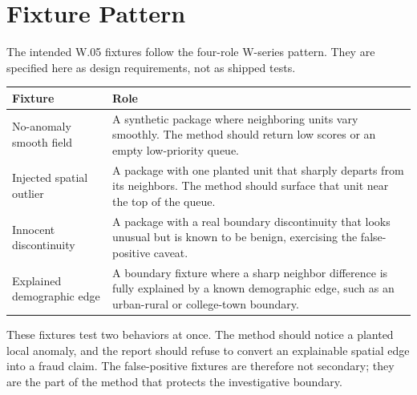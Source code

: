 \section{Fixture Pattern}

The intended W.05 fixtures follow the four-role W-series pattern. They are
specified here as design requirements, not as shipped tests.

\begin{center}
\small
\begin{tabularx}{\textwidth}{lX}
\toprule
Fixture & Role \\
\midrule
No-anomaly smooth field & A synthetic package where neighboring units vary smoothly. The method should return low scores or an empty low-priority queue. \\
Injected spatial outlier & A package with one planted unit that sharply departs from its neighbors. The method should surface that unit near the top of the queue. \\
Innocent discontinuity & A package with a real boundary discontinuity that looks unusual but is known to be benign, exercising the false-positive caveat. \\
Explained demographic edge & A boundary fixture where a sharp neighbor difference is fully explained by a known demographic edge, such as an urban-rural or college-town boundary. \\
\bottomrule
\end{tabularx}
\end{center}

These fixtures test two behaviors at once. The method should notice a planted
local anomaly, and the report should refuse to convert an explainable spatial
edge into a fraud claim. The false-positive fixtures are therefore not secondary;
they are the part of the method that protects the investigative boundary.
